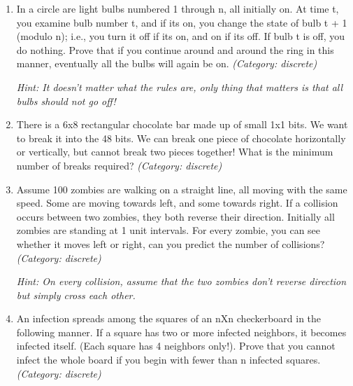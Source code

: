 \begin{enumerate}
\item In a circle are light bulbs numbered 1 through n, all initially on. At time t, you examine bulb number t, and if its on, you change the state of bulb t + 1 (modulo n); i.e., you turn it off if its on, and on if its off. If bulb t is off, you do nothing. Prove that if you continue around and around the ring in this manner, eventually all the bulbs will again be on.
\small\emph{(Category: discrete)}

\small\emph{Hint: It doesn't matter what the rules are, only thing that matters is that all bulbs should not go off!}





\item There is a 6x8 rectangular chocolate bar made up of small 1x1 bits. We want to break it into the 48 bits.  We can break one piece of chocolate horizontally or vertically, but cannot break two pieces together!  What is the minimum number of breaks required?
\small\emph{(Category: discrete)}




\item Assume 100 zombies are walking on a straight line, all moving with the same speed. Some are moving towards left, and some towards right. If a collision occurs between two zombies, they both reverse their direction. Initially all zombies are standing at 1 unit intervals. For every zombie, you can see whether it moves left or right, can you predict the number of collisions?
\small\emph{(Category: discrete)}

\small\emph{Hint: On every collision, assume that the two zombies don't reverse direction but simply cross each other.}





\item An infection spreads among the squares of an nXn checkerboard in the following manner. If a square has two or more infected neighbors, it becomes infected itself. (Each square has 4 neighbors only!). Prove that you cannot infect the whole board if you begin with fewer than n infected squares.
\small\emph{(Category: discrete)}


\end{enumerate}
